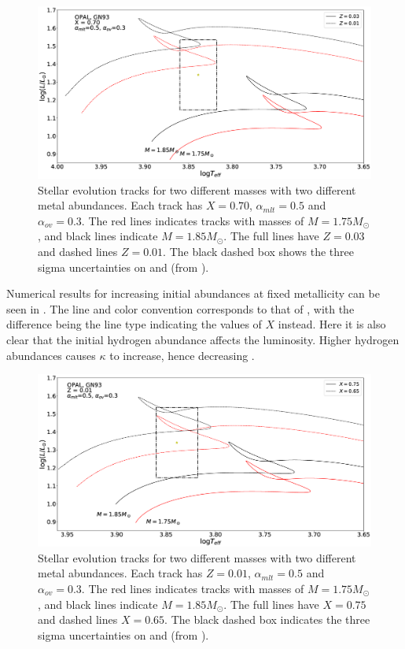 \begin{figure}[htbp]
	\centering
	\includegraphics[width=1\textwidth]{test_z.eps}
	\caption{Stellar evolution tracks for two different masses with two different metal abundances. Each track has $X=0.70$, $\alpha_{mlt}=0.5$ and $\alpha_{ov}=0.3$. The red lines indicates tracks with masses of $M=1.75M_\odot$, and black lines indicate $M=1.85M_\odot$. The full lines have $Z = 0.03$ and dashed lines $Z = 0.01$. The black dashed box shows the three sigma uncertainties on \lum and \teff (from \citet{lenz2010delta}). }
	\label{diffz}
\end{figure}

Numerical results for increasing initial abundances at fixed metallicity can be seen in . The line and color convention corresponds to that of , with the difference being the line type indicating the values of $X$ instead. Here it is also clear that the initial hydrogen abundance affects the luminosity. Higher hydrogen abundances causes $\kappa$ to increase, hence decreasing \lum.

\begin{figure}[htbp]
	\centering
	\includegraphics[width=1\textwidth]{test_x.eps}
	\caption{Stellar evolution tracks for two different masses with two different metal abundances. Each track has $Z=0.01$, $\alpha_{mlt}=0.5$ and $\alpha_{ov}=0.3$. The red lines indicates tracks with masses of $M=1.75M_\odot$, and black lines indicate $M=1.85M_\odot$. The full lines have $X = 0.75$ and dashed lines $X = 0.65$. The black dashed box indicates the three sigma uncertainties on \lum and \teff (from \citet{lenz2010delta}).}
	\label{diffx}
\end{figure}

